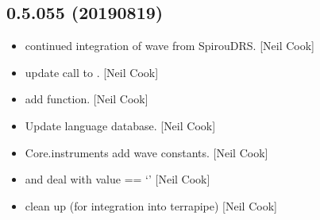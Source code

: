 \documentclass[a4paper,10pt,english]{report}
\begin{document}
\subsection{0.5.055 (2019\sphinxhyphen{}08\sphinxhyphen{}19)}
\label{\detokenize{misc/changelog:id106}}\begin{itemize}
\item {} 
 \sphinxhyphen{} continued integration of wave from SpirouDRS.
{[}Neil Cook{]}

\item {} 
 \sphinxhyphen{} update call to . {[}Neil Cook{]}

\item {} 
 \sphinxhyphen{} add  function. {[}Neil Cook{]}

\item {} 
Update language database. {[}Neil Cook{]}

\item {} 
Core.instruments \sphinxhyphen{} add wave constants. {[}Neil Cook{]}

\item {} 
 \sphinxhyphen{}  and
 \sphinxhyphen{} deal with value == ‘’ {[}Neil Cook{]}

\item {} 
 \sphinxhyphen{} clean up (for integration into terrapipe) {[}Neil Cook{]}

\end{itemize}
\end{document}
